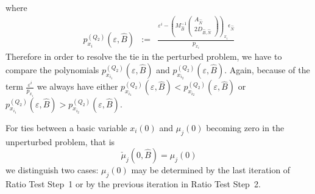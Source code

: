 \documentclass[a4paper]{article}
\begin{document}
where
\begin{eqnarray}
\label{def:p_x_i_Q_2}
p_{x_{i}}^{(Q_{2})}(\varepsilon, \hat{B}) &:=&
  \frac{\varepsilon^{i} -
         \left(M_{\hat{B}}^{-1}
           \left(\begin{array}{c}
                    A_{\hat{N}}  \\
	            \hline
	            2D_{\hat{B}, \hat{N}}
	         \end{array}
	   \right)
         \right)_{x_{i}}\epsilon_{\hat{N}}}{p_{x_{i}}}
\end{eqnarray}
Therefore in order to resolve the tie in the perturbed problem, we have to
compare the polynomials $p_{x_{i_{1}}}^{(Q_{2})}(\varepsilon, \hat{B})$ and
$p_{x_{i_{2}}}^{(Q_{2})}(\varepsilon, \hat{B})$. Again, because of the term
$\frac{\varepsilon^{i}}{p_{x_{i}}}$ we always have either
$p_{x_{i_{1}}}^{(Q_{2})}(\varepsilon, \hat{B}) <
p_{x_{i_{2}}}^{(Q_{2})}(\varepsilon, \hat{B})$ or
$p_{x_{i_{1}}}^{(Q_{2})}(\varepsilon, \hat{B}) >
p_{x_{i_{2}}}^{(Q_{2})}(\varepsilon, \hat{B})$.

For ties between a basic variable $x_{i}(0)$ and $\mu_{j}(0)$ becoming zero
in the unperturbed problem, that is
\begin{equation}
\label{eq:tie_unpert_ratio_test_step_2}
  \check{\mu}_{j}(0, \hat{B}) = \mu_{j}\left(0\right)
\end{equation}
we distinguish two cases: $\mu_{j}(0)$ may be
determined by the last iteration of Ratio Test Step~1 or by the previous
iteration in Ratio Test Step~2.
\end{document}
